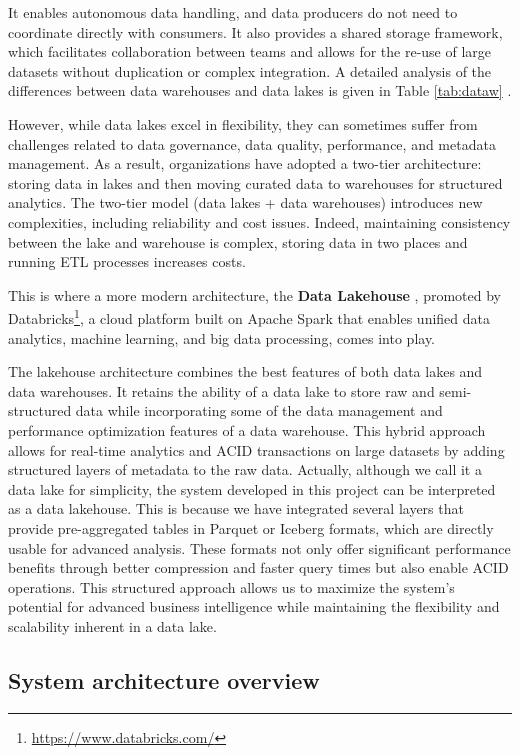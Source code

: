 It enables autonomous data handling, and data producers do not need to coordinate directly with consumers. It also provides a shared storage framework, which facilitates collaboration between teams and allows for the re-use of large datasets without duplication or complex integration. A detailed analysis of the differences between data warehouses and data lakes is given in Table \ref{tab:dataw} \cite{nambiar2022overview}.

However, while data lakes excel in flexibility, they can sometimes suffer from challenges related to data governance, data quality, performance, and metadata management. As a result, organizations have adopted a two-tier architecture: storing data in lakes and then moving curated data to warehouses for structured analytics.
The two-tier model (data lakes + data warehouses) introduces new complexities, including reliability and cost issues. Indeed, maintaining consistency between the lake and warehouse is complex, storing data in two places and running \ac{ETL} processes increases costs.

This is where a more modern architecture, the \textbf{Data Lakehouse} \cite{armbrust2021lakehouse}, promoted by Databricks\footnote{\url{https://www.databricks.com/}}, a cloud platform built on Apache Spark that enables unified data analytics, machine learning, and big data processing, comes into play.

The lakehouse architecture combines the best features of both data lakes and data warehouses. It retains the ability of a data lake to store raw and semi-structured data while incorporating some of the data management and performance optimization features of a data warehouse. This hybrid approach allows for real-time analytics and \ac{ACID} transactions on large datasets by adding structured layers of metadata to the raw data.
Actually, although we call it a data lake for simplicity, the system developed in this project can be interpreted as a data lakehouse. This is because we have integrated several layers that provide pre-aggregated tables in Parquet or Iceberg formats, which are directly usable for advanced analysis. These formats not only offer significant performance benefits through better compression and faster query times but also enable \ac{ACID} operations. This structured approach allows us to maximize the system's potential for advanced business intelligence while maintaining the flexibility and scalability inherent in a data lake.

\subsection{System architecture overview}
\label{sec:wholesystem}

